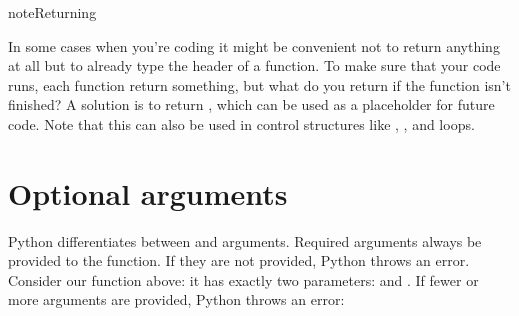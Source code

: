 \documentclass[letterpaper,10pt,english]{jupyterBook}
\begin{document}
\begin{sphinxadmonition}{note}{Returning }

\sphinxAtStartPar
In some cases \sphinxhyphen{} when you’re coding \sphinxhyphen{} it might be convenient not to return anything at all but to already type the header of a function. To make sure that your code runs, each function  return something, but what do you return if the function isn’t finished? A solution is to return , which can be used as a placeholder for future code. Note that this can also be used in control structures like , , and loops.

\begin{sphinxVerbatim}[commandchars=\\\{\}]
 
     
\end{sphinxVerbatim}
\end{sphinxadmonition}


\section{Optional arguments}
\label{\detokenize{notebooks/04_Functions/04_Functions_student:optional-arguments}}
\sphinxAtStartPar
Python differentiates between  and  arguments. Required arguments  always be provided to the function. If they are not provided, Python throws an error. Consider our  function above: it has exactly two parameters:  and . If fewer or more arguments are provided, Python throws an error:
\end{document}
